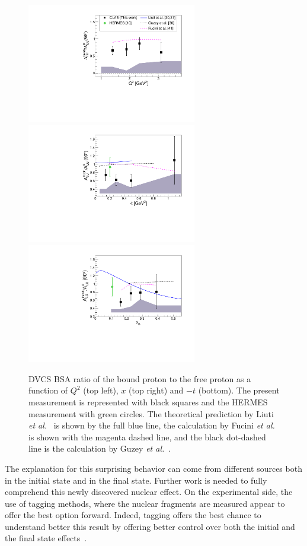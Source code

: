 \documentclass[aps,prc,preprint,superscriptaddress]{revtex4}
\begin{document}
\begin{figure}[tbp!]
\center
\includegraphics[width=7.4cm]{ALU_ratioInc_Q2_shortscenrario.pdf}
\includegraphics[width=7.4cm]{ALU_ratioInc_t_shortscenrario.pdf}
\includegraphics[width=7.4cm]{ALU_ratioInc_x_shortscenrario.pdf}
	\caption{DVCS BSA ratio of the bound proton to the free proton as a function of 
	$Q^2$ (top left), $x$ (top right) and $-t$ (bottom). The present measurement is 
	represented with black squares and the HERMES 
	measurement \cite{Airapetian:2009cga} with green circles. The theoretical prediction
	by Liuti {\it et al.}~\cite{Liuti:2005gi,GonzalezHernandez:2012jv} is shown 
	by the full blue line, the calculation by Fucini 
	{\it et al.}~\cite{Fucini:2019xlc} is shown with the magenta dashed line, and 
	the black dot-dashed line is the calculation by Guzey {\it et al.}~\cite{Guzey:2008th}.}
\label{fig:IncRatios}
\end{figure}

The explanation for this surprising behavior can come from different sources
both in the initial state and in the final state. 
Further work is needed to fully comprehend this newly discovered nuclear effect. On the 
experimental side, the use of tagging methods, where the nuclear fragments are measured
appear to offer the best option forward. Indeed, tagging offers the best chance to understand better
this result by offering better control over both the initial and the final state 
effects~\cite{Dupre:2015jha}.
\end{document}
